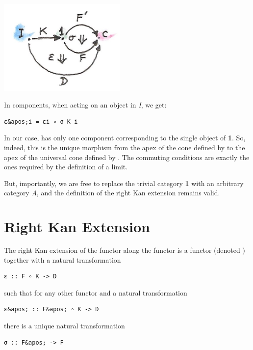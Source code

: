 \includegraphics[width=2.46875in]{images/kan5.jpg}

In components, when acting on an object  in \emph{I}, we get:

\begin{verbatim}
ε&apos;i = εi ∘ σ K i
\end{verbatim}

In our case,  has only one component corresponding to the
single object of \textbf{1}. So, indeed, this is the unique morphism
from the apex of the cone defined by  to the apex of
the universal cone defined by . The commuting conditions
are exactly the ones required by the definition of a limit.

But, importantly, we are free to replace the trivial category \textbf{1}
with an arbitrary category \emph{A}, and the definition of the right Kan
extension remains valid.

\section{Right Kan Extension}\label{right-kan-extension}

The right Kan extension of the functor 
along the functor  is a functor
 (denoted ) together with a
natural transformation

\begin{verbatim}
ε :: F ∘ K -> D
\end{verbatim}

such that for any other functor  and
a natural transformation

\begin{verbatim}
ε&apos; :: F&apos; ∘ K -> D
\end{verbatim}

there is a unique natural transformation

\begin{verbatim}
σ :: F&apos; -> F
\end{verbatim}

